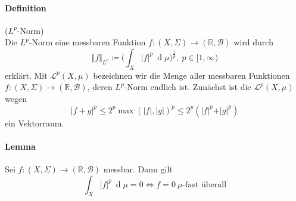 \documentclass[12pt,a4paper,fleqn]{article}
\def\d{{\operatorname{d}}}
\begin{document}
\paragraph{Definition} ($L^p$-Norm)\\
Die $L^p$-Norm eine messbaren Funktion $f\colon (X, \Sigma) \rightarrow (\mathbb{R}, \mathcal{B})$ wird durch
\begin{displaymath}
\Vert f \Vert _{L^p} \coloneqq \bigg( \int_X \vert f \vert ^p\ \d\mu \bigg)^{\frac{1}{p}},\ p \in [1, \infty)
\end{displaymath}
erklärt. Mit $\mathscr{L}^p(X, \mu)$ bezeichnen wir die Menge aller messbaren Funktionen\linebreak \mbox{$f\colon (X, \Sigma) \rightarrow (\mathbb{R}, \mathcal{B})$}, deren $L^p$-Norm endlich ist. Zunächst ist die $\mathscr{L}^p(X, \mu)$ wegen
\begin{displaymath}
\vert f + g \vert ^p \leq 2^p \max(\vert f \vert, \vert g \vert)^p \leq 2^p (\vert f \vert ^p + \vert g \vert ^p)
\end{displaymath}
ein Vektorraum.

\paragraph{Lemma} Sei $f\colon (X, \Sigma) \rightarrow (\mathbb{R}, \mathcal{B})$ messbar. Dann gilt
\begin{displaymath}
\int_X \vert f \vert ^p\ \d\mu = 0 \Leftrightarrow f = 0\ \mu \text{-fast überall}
\end{displaymath}
\end{document}
